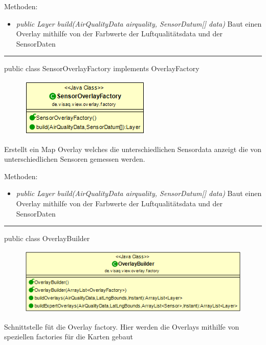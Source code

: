 Methoden:
\begin{itemize} 
    \item \emph{public Layer build(AirQualityData airquality, SensorDatum[] data)}  Baut einen Overlay mithilfe von der Farbwerte der Luftqualitätsdata und der SensorDaten
\end{itemize}

\rule{\textwidth}{0.4pt} 
public class SensorOverlayFactory implements OverlayFactory

\begin{minipage}{0.3\textwidth}
    \begin{figure}[H]
        \includegraphics[scale = 0.5]{media/frontend/view/de.view.overlay.factory/SensorOverlayFactory_Class.png}
    \end{figure}
    \end{minipage} \hfill
    \begin{minipage}{0.6\textwidth}
        Erstellt ein Map Overlay welches die unterschiedlichen Sensordata anzeigt die von unterschiedlichen Sensoren gemessen werden.
\end{minipage}

Methoden:
\begin{itemize} 
    \item \emph{public Layer build(AirQualityData airquality, SensorDatum[] data)}  Baut einen Overlay mithilfe von der Farbwerte der Luftqualitätsdata und der SensorDaten
\end{itemize}

\rule{\textwidth}{0.4pt} 
public class OverlayBuilder

\begin{minipage}{0.6\textwidth}
    \begin{figure}[H]
        \includegraphics[scale = 0.5]{media/frontend/view/de.view.overlay.factory/OverlayBuilder_Class.png}
    \end{figure}
    \end{minipage} \hfill
    \begin{minipage}{0.4\textwidth}
Schnittstelle füt die Overlay factory. Hier werden die Overlays mithilfe von speziellen factories für die Karten gebaut
\end{minipage}

